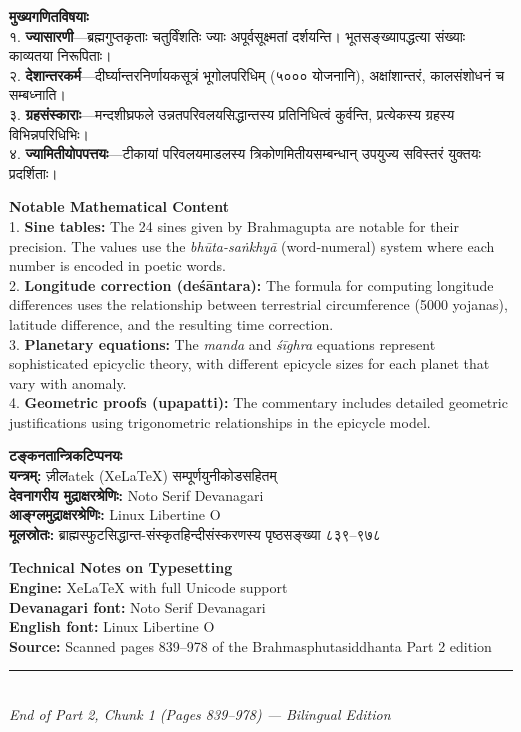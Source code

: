 \documentclass[11pt,a4paper]{book}
\newcommand{\dev}[1]{{\devanagarifont #1}}
\newcommand{\bilingual}[2]{%
  \par\vspace{0.6em}%
  \noindent\begin{minipage}[t]{0.48\textwidth}
    \RaggedRight
    #1%
  \end{minipage}%
  \hfill
  \begin{minipage}[t]{0.48\textwidth}
    \RaggedRight
    #2%
  \end{minipage}%
  \par\vspace{0.6em}%
}
\begin{document}
\bilingual{%
\textbf{\dev{मुख्यगणितविषयाः}}\\[0.5em]
१. \textbf{ज्यासारणी}---ब्रह्मगुप्तकृताः चतुर्विंशतिः ज्याः अपूर्वसूक्ष्मतां दर्शयन्ति। भूतसङ्ख्यापद्धत्या संख्याः काव्यतया निरूपिताः।\\[0.2em]
२. \textbf{देशान्तरकर्म}---दीर्घ्यान्तरनिर्णायकसूत्रं भूगोलपरिधिम्‌ (५००० योजनानि), अक्षांशान्तरं, कालसंशोधनं च सम्बध्नाति।\\[0.2em]
३. \textbf{ग्रहसंस्काराः}---मन्दशीघ्रफले उन्नतपरिवलयसिद्धान्तस्य प्रतिनिधित्वं कुर्वन्ति, प्रत्येकस्य ग्रहस्य विभिन्नपरिधिभिः।\\[0.2em]
४. \textbf{ज्यामितीयोपपत्तयः}---टीकायां परिवलयमाडलस्य त्रिकोणमितीयसम्बन्धान्‌ उपयुज्य सविस्तरं युक्तयः प्रदर्शिताः।
}{%
\textbf{Notable Mathematical Content}\\[0.5em]
1. \textbf{Sine tables:} The 24 sines given by Brahmagupta are notable for their precision. The values use the \textit{bhūta-saṅkhyā} (word-numeral) system where each number is encoded in poetic words.\\[0.2em]
2. \textbf{Longitude correction (deśāntara):} The formula for computing longitude differences uses the relationship between terrestrial circumference (5000 yojanas), latitude difference, and the resulting time correction.\\[0.2em]
3. \textbf{Planetary equations:} The \textit{manda} and \textit{śīghra} equations represent sophisticated epicyclic theory, with different epicycle sizes for each planet that vary with anomaly.\\[0.2em]
4. \textbf{Geometric proofs (upapatti):} The commentary includes detailed geometric justifications using trigonometric relationships in the epicycle model.
}

\vspace{1em}

\bilingual{%
\textbf{\dev{टङ्कनतान्त्रिकटिप्पनयः}}\\[0.5em]
\textbullet{} \textbf{यन्त्रम्‌:} ज़ीलatek (XeLaTeX) सम्पूर्णयुनीकोडसहितम्‌\\
\textbullet{} \textbf{देवनागरीय मुद्राक्षरश्रेणिः:} Noto Serif Devanagari\\
\textbullet{} \textbf{आङ्ग्लमुद्राक्षरश्रेणिः:} Linux Libertine O\\
\textbullet{} \textbf{मूलस्रोतः:} ब्राह्मस्फुटसिद्धान्त-संस्कृतहिन्दीसंस्करणस्य पृष्ठसङ्ख्या ८३९--९७८
}{%
\textbf{Technical Notes on Typesetting}\\[0.5em]
\textbullet{} \textbf{Engine:} XeLaTeX with full Unicode support\\
\textbullet{} \textbf{Devanagari font:} Noto Serif Devanagari\\
\textbullet{} \textbf{English font:} Linux Libertine O\\
\textbullet{} \textbf{Source:} Scanned pages 839--978 of the Brahmasphutasiddhanta Part 2 edition
}

\vspace{1cm}
\begin{center}
\rule{0.4\textwidth}{0.5pt}\\[0.5cm]
{\small\textit{End of Part 2, Chunk 1 (Pages 839--978) --- Bilingual Edition}}
\end{center}
\end{document}
